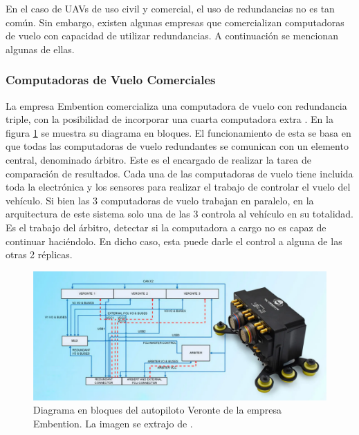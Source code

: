 En el caso de UAVs de uso civil y comercial, el uso de redundancias no es tan común. Sin embargo, existen algunas empresas que comercializan computadoras de vuelo con capacidad de utilizar redundancias. A continuación se mencionan algunas de ellas.

\subsubsection{Computadoras de Vuelo Comerciales}

La empresa Embention comercializa una computadora de vuelo con redundancia triple, con la posibilidad de incorporar una cuarta computadora extra \cite{embention-2023}. En la figura \ref{fig:Veronte_Embention} se muestra su diagrama en bloques. El funcionamiento de esta se basa en que todas las computadoras de vuelo redundantes se comunican con un elemento central, denominado árbitro. Este es el encargado de realizar la tarea de comparación de resultados. Cada una de las computadoras de vuelo tiene incluida toda la electrónica y los sensores para realizar el trabajo de controlar el vuelo del vehículo. Si bien las 3 computadoras de vuelo trabajan en paralelo, en la arquitectura de este sistema solo una de las 3 controla al vehículo en su totalidad. Es el trabajo del árbitro, detectar si la computadora a cargo no es capaz de continuar haciéndolo. En dicho caso, esta puede darle el control a alguna de las otras 2 réplicas.

\begin{figure}[H]
    \centering
    \includegraphics[width=\textwidth]{img/Veronte_Embention.png}
    \caption{Diagrama en bloques del autopiloto Veronte de la empresa Embention. La imagen se extrajo de \cite{embention-2023}.}
    \label{fig:Veronte_Embention}    
\end{figure}


